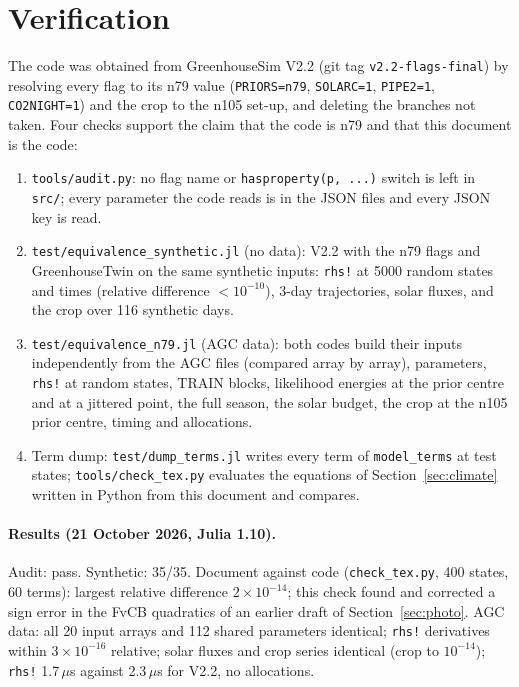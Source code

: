 \documentclass[11pt,a4paper]{article}
\newcommand{\code}[1]{\texttt{#1}}
\begin{document}
\section{Verification}\label{sec:verify}
The code was obtained from GreenhouseSim V2.2 (git tag \code{v2.2-flags-final}) by resolving every flag to its n79 value
(\code{PRIORS=n79}, \code{SOLARC=1}, \code{PIPE2=1}, \code{CO2NIGHT=1}) and the crop to the n105 set-up, and deleting the
branches not taken. Four checks support the claim that the code is n79 and that this document is the code:
\begin{enumerate}[nosep]
\item \code{tools/audit.py}: no flag name or \code{hasproperty(p, ...)} switch is left in \code{src/}; every parameter the code
reads is in the JSON files and every JSON key is read.
\item \code{test/equivalence\_synthetic.jl} (no data): V2.2 with the n79 flags and GreenhouseTwin on the same synthetic
inputs: \code{rhs!} at 5000 random states and times (relative difference $<10^{-10}$), 3-day trajectories, solar fluxes, and the
crop over 116 synthetic days.
\item \code{test/equivalence\_n79.jl} (AGC data): both codes build their inputs independently from the AGC files (compared
array by array), parameters, \code{rhs!} at random states, TRAIN blocks, likelihood energies at the prior centre and at a
jittered point, the full season, the solar budget, the crop at the n105 prior centre, timing and allocations.
\item Term dump: \code{test/dump\_terms.jl} writes every term of \code{model\_terms} at test states; \code{tools/check\_tex.py}
evaluates the equations of Section~\ref{sec:climate} written in Python from this document and compares.
\end{enumerate}
\paragraph{Results (21 October 2026, Julia 1.10).} Audit: pass. Synthetic: 35/35. Document against code (\code{check\_tex.py},
400 states, 60 terms): largest relative difference $2\times10^{-14}$; this check found and corrected a sign error in the FvCB
quadratics of an earlier draft of Section~\ref{sec:photo}. AGC data: all 20 input arrays and 112 shared parameters identical;
\code{rhs!} derivatives within $3\times10^{-16}$ relative; solar fluxes and crop series identical (crop to $10^{-14}$);
\code{rhs!} 1.7\,$\mu$s against 2.3\,$\mu$s for V2.2, no allocations.
\end{document}
